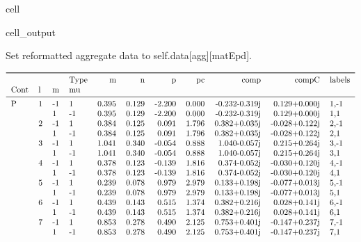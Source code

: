 \documentclass[letterpaper,table,10pt,english]{jupyterBook}
\begin{document}
\begin{sphinxuseclass}{cell}
\begin{sphinxVerbatimOutput}
\begin{sphinxuseclass}{cell_output}
\begin{sphinxVerbatim}[commandchars=\\\{\}]
Set reformatted aggregate data to self.data[agg][matEpd].
\end{sphinxVerbatim}
\begin{equation*}
\begin{split}\begin{tabular}{llllrrrrrrl}
\toprule
  &   &    & Type &      m &      n &      p &     pc &          comp &         compC & labels \\
Cont & l & m & mu &        &        &        &        &               &               &        \\
\midrule
P & 1 & -1 &  1 &  0.395 &  0.129 & -2.200 &  0.000 & -0.232-0.319j &  0.129+0.000j &   1,-1 \\
  &   &  1 & -1 &  0.395 &  0.129 & -2.200 &  0.000 & -0.232-0.319j &  0.129+0.000j &    1,1 \\
  & 2 & -1 &  1 &  0.384 &  0.125 &  0.091 &  1.796 &  0.382+0.035j & -0.028+0.122j &   2,-1 \\
  &   &  1 & -1 &  0.384 &  0.125 &  0.091 &  1.796 &  0.382+0.035j & -0.028+0.122j &    2,1 \\
  & 3 & -1 &  1 &  1.041 &  0.340 & -0.054 &  0.888 &  1.040-0.057j &  0.215+0.264j &   3,-1 \\
  &   &  1 & -1 &  1.041 &  0.340 & -0.054 &  0.888 &  1.040-0.057j &  0.215+0.264j &    3,1 \\
  & 4 & -1 &  1 &  0.378 &  0.123 & -0.139 &  1.816 &  0.374-0.052j & -0.030+0.120j &   4,-1 \\
  &   &  1 & -1 &  0.378 &  0.123 & -0.139 &  1.816 &  0.374-0.052j & -0.030+0.120j &    4,1 \\
  & 5 & -1 &  1 &  0.239 &  0.078 &  0.979 &  2.979 &  0.133+0.198j & -0.077+0.013j &   5,-1 \\
  &   &  1 & -1 &  0.239 &  0.078 &  0.979 &  2.979 &  0.133+0.198j & -0.077+0.013j &    5,1 \\
  & 6 & -1 &  1 &  0.439 &  0.143 &  0.515 &  1.374 &  0.382+0.216j &  0.028+0.141j &   6,-1 \\
  &   &  1 & -1 &  0.439 &  0.143 &  0.515 &  1.374 &  0.382+0.216j &  0.028+0.141j &    6,1 \\
  & 7 & -1 &  1 &  0.853 &  0.278 &  0.490 &  2.125 &  0.753+0.401j & -0.147+0.237j &   7,-1 \\
  &   &  1 & -1 &  0.853 &  0.278 &  0.490 &  2.125 &  0.753+0.401j & -0.147+0.237j &    7,1 \\

\end{tabular}
\end{split}
\end{equation*}
\end{sphinxuseclass}
\end{sphinxVerbatimOutput}
\end{sphinxuseclass}
\end{document}
